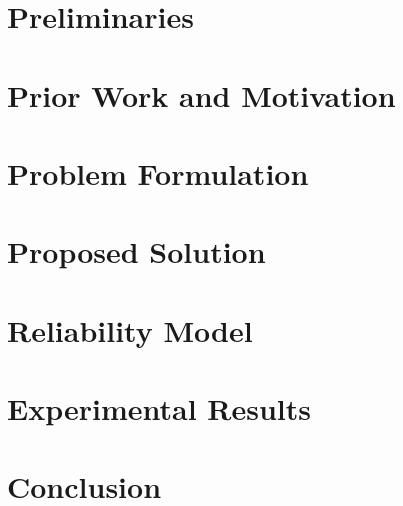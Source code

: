\documentclass[conference]{IEEEtran}
\begin{document}
  \section{Preliminaries} \label{sec:preliminaries}
  

  \section{Prior Work and Motivation} \label{sec:motivation}
  

  \section{Problem Formulation} \label{sec:problem}
  

  \section{Proposed Solution} \label{sec:solution}
  

  \section{Reliability Model} \label{sec:reliability}
  

  \section{Experimental Results} \label{sec:results}
  

  \section{Conclusion} \label{sec:conclusion}
  

  
\end{document}
